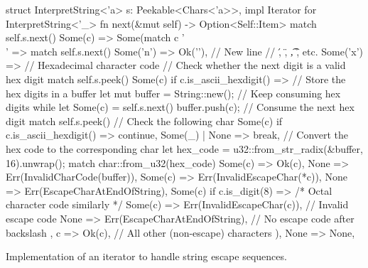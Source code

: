 \documentclass[../00-main.tex]{subfiles}
\begin{document}
\begin{listing}[!t]
  \begin{RustListing}
    struct InterpretString<'a> {
        s: Peekable<Chars<'a>>,
    }
    impl Iterator for InterpretString<'_> {
        fn next(&mut self) -> Option<Self::Item> {
            match self.s.next() {
                Some(c) => Some(match c {
                    '\\' => match self.s.next() {
                        Some('n') => Ok('\n'),  // New line
                        // \', \", \t, \r, etc.
                        Some('x') => { // Hexadecimal character code
                            // Check whether the next digit is a valid hex digit
                            match self.s.peek() {
                                Some(c) if c.is_ascii_hexdigit() => {
                                    // Store the hex digits in a buffer
                                    let mut buffer = String::new();
                                    // Keep consuming hex digits
                                    while let Some(c) = self.s.next() {
                                        buffer.push(c); // Consume the next hex digit
                                        match self.s.peek() { // Check the following char
                                            Some(c) if c.is_ascii_hexdigit() => continue,
                                            Some(_) | None => break,
                                        }
                                    }
                                    // Convert the hex code to the corresponding char
                                    let hex_code = u32::from_str_radix(&buffer, 16).unwrap();
                                    match char::from_u32(hex_code) {
                                        Some(c) => Ok(c),
                                        None => Err(InvalidCharCode(buffer)),
                                    }
                                }
                                Some(c) => Err(InvalidEscapeChar(*c)),
                                None => Err(EscapeCharAtEndOfString),
                            }
                        }
                        Some(c) if c.is_digit(8) => {/* Octal character code similarly */}
                        Some(c) => Err(InvalidEscapeChar(c)), // Invalid escape code
                        None => Err(EscapeCharAtEndOfString), // No escape code after backslash
                    },
                    c => Ok(c), // All other (non-escape) characters
                }),
                None => None,
            }
        }
    }
  \end{RustListing}
  \caption{Implementation of an iterator to handle string escape sequences.}
  \label{app:lst:string escape iterator}
\end{listing}
\end{document}
